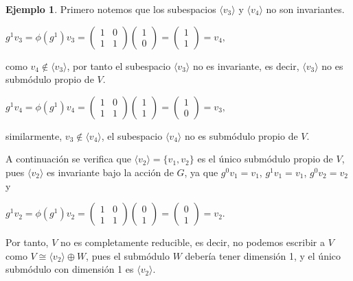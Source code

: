 \documentclass[12pt]{book}
\theoremstyle{definition}
\newtheorem{example}[theorem]{Ejemplo}
\newcounter{in}
\begin{document}
\begin{example}
Primero notemos que los subespacios $\langle v_{3}\rangle$ y $\langle
v_{4}\rangle$ no son invariantes.
\begin{center}
  $g^{1}v_{3}=\phi(g^{1})v_{3}=
  \begin{pmatrix}
      1 & 0 \\
      1 & 1 
    \end{pmatrix}
    \begin{pmatrix}
    1\\
    0  
  \end{pmatrix}=
  \begin{pmatrix}
    1\\
    1  
  \end{pmatrix}=v_{4},
  $
\end{center}
como $v_{4}\not\in\langle v_{3}\rangle$, por tanto el subespacio $\langle
v_{3}\rangle$ no es invariante, es decir, $\langle v_{3} \rangle$ no
es submódulo propio de $V$.
\begin{center}
  $g^{1}v_{4}=\phi(g^{1})v_{4}=
  \begin{pmatrix}
      1 & 0 \\
      1 & 1 
    \end{pmatrix}
    \begin{pmatrix}
    1\\
    1  
  \end{pmatrix}=
  \begin{pmatrix}
    1\\
    0  
  \end{pmatrix}=v_{3},
  $
\end{center}
similarmente, $v_{3}\not\in\langle v_{4}\rangle$, el subespacio $\langle
v_{4}\rangle$ no es submódulo propio de $V$.

A continuación se verifica que $\langle v_{2}\rangle=\{v_{1},v_{2}\}$ es el
único submódulo propio de $V$, pues $\langle v_{2}\rangle$ es
invariante bajo la acción de $G$, ya que $g^{0}v_{1}=v_{1}$,
$g^{1}v_{1}=v_{1}$, $g^{0}v_{2}=v_{2}$ y
\begin{center}
  $g^{1}v_{2}=\phi(g^{1})v_{2}=
  \begin{pmatrix}
      1 & 0 \\
      1 & 1 
    \end{pmatrix}
    \begin{pmatrix}
    0\\
    1  
  \end{pmatrix}=
  \begin{pmatrix}
    0\\
    1  
  \end{pmatrix}=v_{2}.
  $
\end{center}
Por tanto, $V$ no es completamente reducible, es decir, no podemos
escribir a $V$ como $V\cong\langle v_{2}\rangle\oplus W$, pues el
submódulo $W$ debería tener dimensión 1, y el único submódulo con
dimensión 1 es $\langle v_{2}\rangle$.
\end{example}
\end{document}
